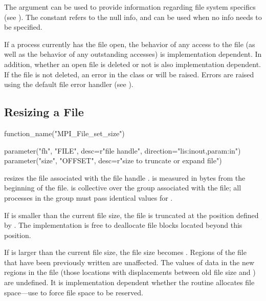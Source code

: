 The  argument can be used to provide information
regarding file system specifics
(see ).
The constant 
refers to the null info, and
can be used when no info needs to be specified.

If a process currently has the file open,
the behavior of any access to the file
(as well as the behavior of any outstanding accesses)
is implementation dependent.
In addition, whether an open file is deleted or not is also
implementation dependent.
If the file is not deleted,
an error in the class
 or  will be raised.
Errors are raised 
using the default file error handler
(see ).

\subsection{Resizing a File}
\label{sec:io-filecntl-resize}

%
%
\begin{mpi-binding}
    function_name("MPI_File_set_size")
    
    parameter("fh", "FILE", desc=r"file handle", direction="lis:inout,param:in")
    parameter("size", "OFFSET", desc=r"size to truncate or expand file")
\end{mpi-binding}

 resizes the file
associated with the file handle .
 is measured in bytes from the beginning of the file.
 is collective over the group associated with the file;
all processes in the group must pass identical values for .

If  is smaller than the current file size,
the file is truncated at the position defined by .
The implementation is free to deallocate file blocks located
beyond this position.

If  is larger than the current file size,
the file size becomes .
Regions of the file that have been previously written are unaffected.
The values of data in the new regions in the file (those
locations with displacements between old file size and )
are undefined.
It is implementation dependent whether the  routine
allocates file space---use 
to force file space to be reserved.

